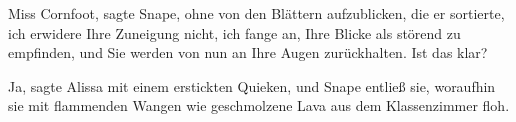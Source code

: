 \glqq Miss Cornfoot\grqq{}, sagte Snape, ohne von den Blättern aufzublicken, die
er sortierte, \glqq ich erwidere Ihre Zuneigung nicht, ich fange an, Ihre Blicke
als störend zu empfinden, und Sie werden von nun an Ihre Augen zurückhalten. Ist
das klar?\grqq{}

\glqq Ja\grqq{}, sagte Alissa mit einem erstickten Quieken, und Snape entließ
sie, woraufhin sie mit flammenden Wangen wie geschmolzene Lava aus dem
Klassenzimmer floh.


